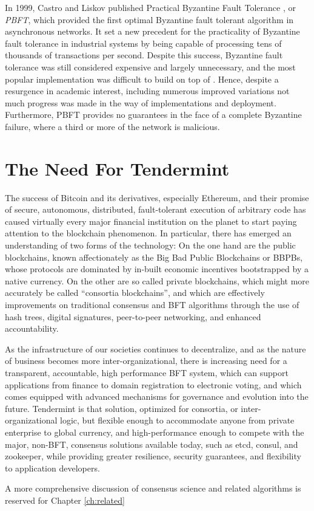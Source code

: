In 1999, Castro and Liskov published Practical Byzantine Fault Tolerance \cite{pbft}, or \emph{PBFT}, 
which provided the first optimal Byzantine fault tolerant algorithm in asynchronous networks.
It set a new precedent for the practicality of Byzantine fault tolerance in industrial systems by being capable 
of processing tens of thousands of transactions per second.
Despite this success, Byzantine fault tolerance was still considered expensive and largely unnecessary, 
and the most popular implementation was difficult to build on top of \cite{ppbft}.
Hence, despite a resurgence in academic interest, including numerous improved variations \cite{yin2003separating, kotla2007zyzzyva}
not much progress was made in the way of implementations and deployment.
Furthermore, PBFT provides no guarantees in the face of a complete Byzantine failure, where a third or more of the network is malicious.

\section{The Need For Tendermint}

The success of Bitcoin and its derivatives, especially Ethereum, and their promise of secure, autonomous, distributed, fault-tolerant execution of arbitrary code has caused virtually every major financial institution on the planet to start paying attention to the blockchain phenomenon. 
In particular, there has emerged an understanding of two forms of the technology:
On the one hand are the public blockchains, known affectionately as the Big Bad Public Blockchains or BBPBs, 
whose protocols are dominated by in-built economic incentives bootstrapped by a native currency.
On the other are so called private blockchains, which might more accurately be called ``consortia blockchains'',
and which are effectively improvements on traditional consensus and BFT algorithms through the use of hash trees, digital signatures, 
peer-to-peer networking, and enhanced accountability.

As the infrastructure of our societies continues to decentralize, and as the nature of business becomes more inter-organizational,
there is increasing need for a transparent, accountable, high performance BFT system, which can support applications from finance to domain registration to electronic voting,
and which comes equipped with advanced mechanisms for governance and evolution into the future.
Tendermint is that solution, optimized for consortia, or inter-organizational logic, but flexible enough to accommodate anyone from private enterprise to global currency,
and high-performance enough to compete with the major, non-BFT, consensus solutions available today, such as etcd, consul, and zookeeper, while providing greater resilience, security guarantees, and flexibility to application developers.

A more comprehensive discussion of consensus science and related algorithms is reserved for Chapter \ref{ch:related}

